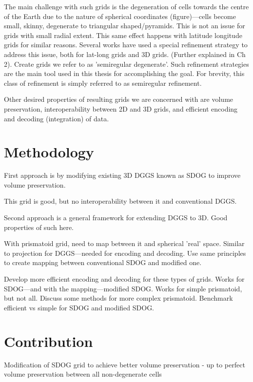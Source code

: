 The main challenge with such grids is the degeneration of cells towards the centre of the Earth due to the nature of spherical coordinates (figure)---cells become small, skinny, degenerate to triangular shaped/pyramids. This is not an issue for grids with small radial extent. This same effect happens with latitude longitude grids for similar reasons. Several works have used a special refinement strategy to address this issue, both for lat-long grids and 3D grids. (Further explained in Ch 2). Create grids we refer to as 'semiregular degenerate'. Such refinement strategies are the main tool used in this thesis for accomplishing the goal. For brevity, this class of refinement is simply referred to as semiregular refinement.  

Other desired properties of resulting grids we are concerned with are volume preservation, interoperability between 2D and 3D grids, and efficient encoding and decoding (integration) of data. 

\section{Methodology}

First approach is by modifying existing 3D DGGS known as SDOG to improve volume preservation.

This grid is good, but no interoperability between it and conventional DGGS.

Second approach is a general framework for extending DGGS to 3D. Good properties of such here.

With prismatoid grid, need to map between it and spherical 'real' space. Similar to projection for DGGS---needed for encoding and decoding. Use same principles to create mapping between conventional SDOG and modified one.

Develop more efficient encoding and decoding for these types of grids. Works for SDOG---and with the mapping---modified SDOG. Works for simple prismatoid, but not all. Discuss some methods for more complex prismatoid. Benchmark efficient vs simple for SDOG and modified SDOG.  

\section{Contribution}

Modification of SDOG grid to achieve better volume preservation
	- up to perfect volume preservation between all non-degenerate cells

